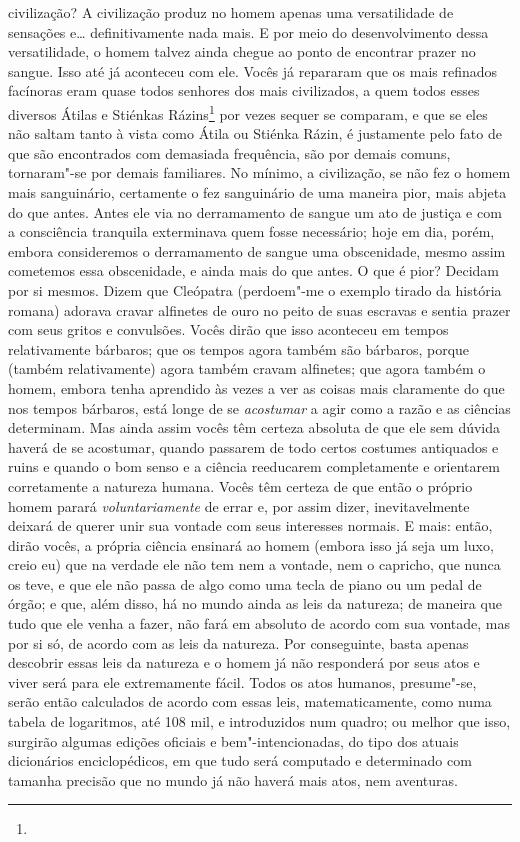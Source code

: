 civilização? A civilização produz no homem apenas uma versatilidade de
sensações e\ldots{} definitivamente nada mais. E por meio do desenvolvimento
dessa versatilidade, o homem talvez ainda chegue ao ponto de encontrar prazer
no sangue. Isso até já aconteceu com ele. Vocês já repararam que os mais
refinados facínoras eram quase todos senhores dos mais civilizados, a quem
todos esses diversos Átilas e Stiénkas Rázins\footnote{} por vezes
sequer se comparam, e que se eles não saltam tanto à vista como Átila ou
Stiénka Rázin, é justamente pelo fato de que são encontrados com demasiada
frequência, são por demais comuns, tornaram"-se por demais familiares.  No
mínimo, a civilização, se não fez o homem mais sanguinário, certamente o fez
sanguinário de uma maneira pior, mais abjeta do que antes. Antes ele via no
derramamento de sangue um ato de justiça e com a consciência tranquila
exterminava quem fosse necessário; hoje em dia, porém, embora consideremos o
derramamento de sangue uma obscenidade, mesmo assim cometemos essa obscenidade,
e ainda mais do que antes. O que é pior? Decidam por si mesmos. Dizem que
Cleópatra (perdoem"-me o exemplo tirado da história romana) adorava cravar
alfinetes de ouro no peito de suas escravas e sentia prazer com seus gritos e
convulsões.  Vocês dirão que isso aconteceu em tempos relativamente bárbaros;
que os tempos agora também são bárbaros, porque (também relativamente) agora
também cravam alfinetes; que agora também o homem, embora tenha aprendido às
vezes a ver as coisas mais claramente do que nos tempos bárbaros, está
longe de se \textit{acostumar} a agir como a razão e as ciências determinam.
Mas ainda assim vocês têm certeza absoluta de que ele sem dúvida haverá de se
acostumar, quando passarem de todo certos costumes antiquados e ruins e quando
o bom senso e a ciência reeducarem completamente e orientarem corretamente a
natureza humana.  Vocês têm certeza de que então o próprio homem parará
\textit{voluntariamente} de errar e, por assim dizer, inevitavelmente deixará
de querer unir sua vontade com seus interesses normais. E mais: então, dirão
vocês, a própria ciência ensinará ao homem (embora isso já seja um luxo, creio
eu) que na verdade ele não tem nem a vontade, nem o capricho, que nunca os
teve, e que ele não passa de algo como uma tecla de piano ou um pedal de órgão;
e que, além disso, há no mundo ainda as leis da natureza; de maneira que tudo
que ele venha a fazer, não fará em absoluto de acordo com sua vontade, mas por
si só, de acordo com as leis da natureza. Por conseguinte, basta apenas
descobrir essas leis da natureza e o homem já não responderá por seus atos e
viver será para ele extremamente fácil. Todos os atos humanos, presume"-se,
serão então calculados de acordo com essas leis, matematicamente, como numa
tabela de logaritmos, até 108 mil, e introduzidos num quadro; ou melhor que
isso, surgirão algumas edições oficiais e bem"-intencionadas, do tipo dos atuais
dicionários enciclopédicos, em que tudo será computado e determinado com
tamanha precisão que no mundo já não haverá mais atos, nem aventuras.

